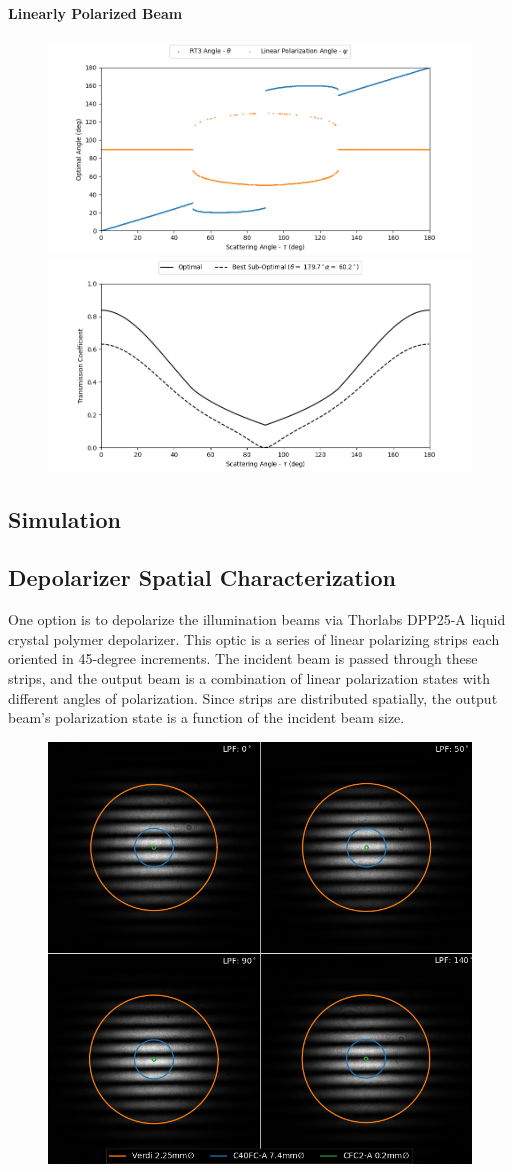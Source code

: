 \paragraph{Linearly Polarized Beam}

\begin{figure}
    \centering
    \includegraphics[width=0.49\linewidth]{figures/polctrl1_traj.png}
    \includegraphics[width=0.49\linewidth]{figures/polctrl1_trans.png}
    \caption{}
    \label{fig:polctrl1}
\end{figure}

\subsection{Simulation}

\subsection{Depolarizer Spatial Characterization}
One option is to depolarize the illumination beams via Thorlabs DPP25-A liquid crystal polymer depolarizer. This optic is a series of linear polarizing strips each oriented in 45-degree increments. The incident beam is passed through these strips, and the output beam is a combination of linear polarization states with different angles of polarization. Since strips are distributed spatially, the output beam's polarization state is a function of the incident beam size.

\begin{figure}
    \centering
    \includegraphics[width=0.5\linewidth]{figures/depol_spatial.png}
    \caption{}
    \label{fig:depol_spatial}
\end{figure}

